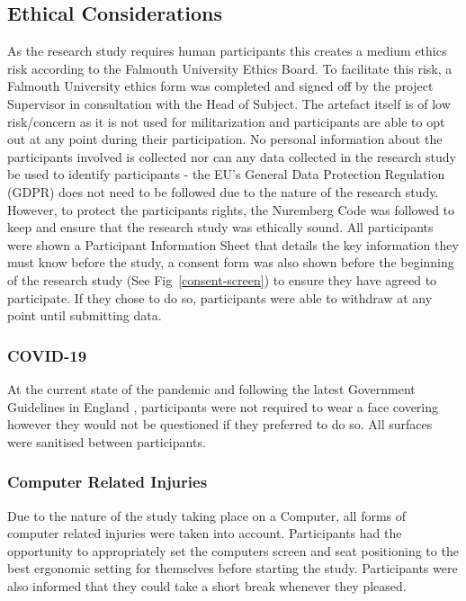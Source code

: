 
\subsection{Ethical Considerations}\label{ethics}
As the research study requires human participants this creates a medium ethics risk according to the Falmouth University Ethics Board. To facilitate this risk, a Falmouth University ethics form was completed and signed off by the project Supervisor in consultation with the Head of Subject. The artefact itself is of low risk/concern as it is not used for militarization and participants are able to opt out at any point during their participation.
No personal information about the participants involved is collected nor can any data collected in the research study be used to identify participants - the EU's General Data Protection Regulation (GDPR)\cite{gdpr} does not need to be followed due to the nature of the research study. However, to protect the participants rights, the Nuremberg Code was followed to keep and ensure that the research study was ethically sound\cite{nuremberg-code}. All participants were shown a Participant Information Sheet that details the key information they must know before the study, a consent form was also shown before the beginning of the research study (See Fig~\ref{consent-screen}) to ensure they have agreed to participate. If they chose to do so, participants were able to withdraw at any point until submitting data.
\\
\subsubsection*{COVID-19}
At the current state of the pandemic and following the latest Government Guidelines in England \cite{gov-guidlines}, participants were not required to wear a face covering however they would not be questioned if they preferred to do so. All surfaces were sanitised between participants.
\\
\subsubsection*{Computer Related Injuries}
Due to the nature of the study taking place on a Computer, all forms of computer related injuries were taken into account. Participants had the opportunity to appropriately set the computers screen and seat positioning to the best ergonomic setting for themselves before starting the study. Participants were also informed that they could take a short break whenever they pleased.
